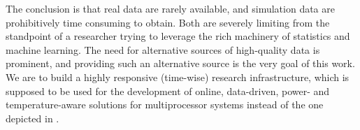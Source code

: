 The conclusion is that real data are rarely available, and simulation data are
prohibitively time consuming to obtain. Both are severely limiting from the
standpoint of a researcher trying to leverage the rich machinery of statistics
and machine learning. The need for alternative sources of high-quality data is
prominent, and providing such an alternative source is the very goal of this
work. We are to build a highly responsive (time-wise) research infrastructure,
which is supposed to be used for the development of online, data-driven, power-
and temperature-aware solutions for multiprocessor systems instead of the one
depicted in .

